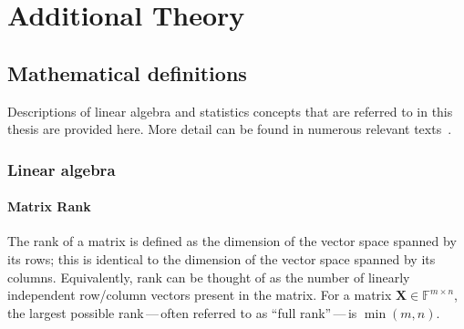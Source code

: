 \chapter{Additional Theory}
\label{chap:additional-theory}

\section{Mathematical definitions}
\label{sec:maths-defs}
Descriptions of linear algebra and statistics concepts that are referred to in
this thesis are provided here. More detail can be found in numerous relevant
texts~\cite{Strang2018,Pawitan2001}.

\subsection{Linear algebra}
\label{subsec:linear-algebra}

\subsubsection{Matrix Rank}
The rank of a matrix is defined as the dimension of the vector space spanned by
its rows; this is identical to the dimension of the vector space spanned by
its columns. Equivalently, rank can be thought of as the number of linearly
independent row/column vectors present in the matrix. For a matrix $\symbf{X}
\in \mathbb{F}^{m \times n}$, the largest possible rank\,---\,often referred to
as ``full rank''\,---\,is $\min(m, n)$.

